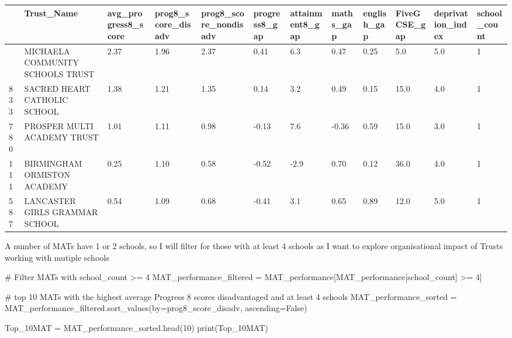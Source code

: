 \documentclass[
  letterpaper,
  DIV=11,
  numbers=noendperiod]{scrartcl}
\newenvironment{Shaded}{\begin{snugshade}}{\end{snugshade}}
\newcommand{\BuiltInTok}[1]{\textcolor[rgb]{0.00,0.23,0.31}{#1}}
\newcommand{\CommentTok}[1]{\textcolor[rgb]{0.37,0.37,0.37}{#1}}
\newcommand{\DecValTok}[1]{\textcolor[rgb]{0.68,0.00,0.00}{#1}}
\newcommand{\NormalTok}[1]{\textcolor[rgb]{0.00,0.23,0.31}{#1}}
\newcommand{\OperatorTok}[1]{\textcolor[rgb]{0.37,0.37,0.37}{#1}}
\newcommand{\StringTok}[1]{\textcolor[rgb]{0.13,0.47,0.30}{#1}}
\newcommand{\VariableTok}[1]{\textcolor[rgb]{0.07,0.07,0.07}{#1}}
\begin{document}
\begin{longtable}[]{@{}llllllllllll@{}}
\toprule\noalign{}
& Trust\_Name & avg\_progress8\_score & prog8\_score\_disadv &
prog8\_score\_nondisadv & progress8\_gap & attainment8\_gap & maths\_gap
& english\_gap & FiveGCSE\_gap & deprivation\_index & school\_count \\
\midrule\noalign{}
\endhead
\bottomrule\noalign{}
\endlastfoot
654 & MICHAELA COMMUNITY SCHOOLS TRUST & 2.37 & 1.96 & 2.37 & 0.41 & 6.3
& 0.47 & 0.25 & 5.0 & 5.0 & 1 \\
833 & SACRED HEART CATHOLIC SCHOOL & 1.38 & 1.21 & 1.35 & 0.14 & 3.2 &
0.49 & 0.15 & 15.0 & 4.0 & 1 \\
780 & PROSPER MULTI ACADEMY TRUST & 1.01 & 1.11 & 0.98 & -0.13 & 7.6 &
-0.36 & 0.59 & 15.0 & 3.0 & 1 \\
111 & BIRMINGHAM ORMISTON ACADEMY & 0.25 & 1.10 & 0.58 & -0.52 & -2.9 &
0.70 & 0.12 & 36.0 & 4.0 & 1 \\
587 & LANCASTER GIRLS\textquotesingle{} GRAMMAR SCHOOL & 0.54 & 1.09 &
0.68 & -0.41 & 3.1 & 0.65 & 0.89 & 12.0 & 5.0 & 1 \\
\end{longtable}

A number of MATs have 1 or 2 schools, so I will filter for those with at
least 4 schools as I want to explore organisational impact of Trusts
working with mutiple schools

\begin{Shaded}
\begin{Highlighting}[]

\CommentTok{\# Filter MATs with school\_count \textgreater{}= 4 }
\NormalTok{MAT\_performance\_filtered }\OperatorTok{=}\NormalTok{ MAT\_performance[MAT\_performance[}\StringTok{\textquotesingle{}school\_count\textquotesingle{}}\NormalTok{] }\OperatorTok{\textgreater{}=} \DecValTok{4}\NormalTok{]}

\CommentTok{\# top 10 MATs with the highest average Progress 8 scores disadvantaged and at least 4 schools}
\NormalTok{MAT\_performance\_sorted }\OperatorTok{=}\NormalTok{ MAT\_performance\_filtered.sort\_values(by}\OperatorTok{=}\StringTok{\textquotesingle{}prog8\_score\_disadv\textquotesingle{}}\NormalTok{, ascending}\OperatorTok{=}\VariableTok{False}\NormalTok{)}


\NormalTok{Top\_10MAT }\OperatorTok{=}\NormalTok{ MAT\_performance\_sorted.head(}\DecValTok{10}\NormalTok{)}
\BuiltInTok{print}\NormalTok{(Top\_10MAT)}
\end{Highlighting}
\end{Shaded}
\end{document}
